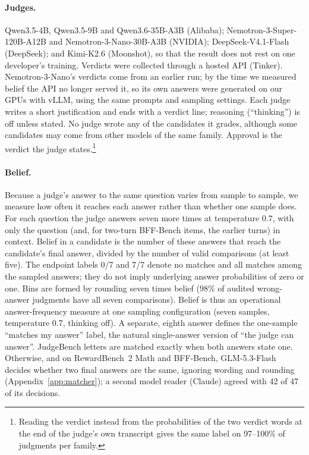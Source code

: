 \documentclass[11pt]{article}
\begin{document}
\paragraph{Judges.}
Qwen3.5-4B, Qwen3.5-9B and Qwen3.6-35B-A3B (Alibaba); Nemotron-3-Super-120B-A12B and Nemotron-3-Nano-30B-A3B
(NVIDIA); DeepSeek-V4.1-Flash (DeepSeek); and Kimi-K2.6 (Moonshot), so that the result does not rest on one
developer's training. Verdicts were collected through a hosted API (Tinker). Nemotron-3-Nano's verdicts come from an
earlier run; by the time we measured belief the API no longer served it, so its own answers were generated on our
GPUs with vLLM, using the same prompts and sampling settings. Each judge writes a short justification and ends with
a verdict line; reasoning (``thinking'') is off unless stated. No judge wrote any of the candidates it grades,
although some candidates may come from other models of the same family. Approval is the verdict the judge
states.\footnote{Reading the verdict instead from the probabilities of the two verdict words at the end of the
judge's own transcript gives the same label on 97--100\% of judgments per family.}

\paragraph{Belief.}
Because a judge's answer to the same question varies from sample to sample, we measure how often it reaches each
answer rather than whether one sample does. For each question the judge answers seven more times at temperature 0.7,
with only the question (and, for two-turn BFF-Bench items, the earlier turns) in context. Belief in a candidate is the number of these answers that reach the
candidate's final answer, divided by the number of valid comparisons (at least five). The endpoint labels 0/7 and
7/7 denote no matches and all matches among the sampled answers; they do not imply underlying answer probabilities
of zero or one. Bins are formed by rounding seven times belief (98\% of audited wrong-answer judgments have all seven
comparisons). Belief is thus an operational answer-frequency measure at one sampling configuration (seven samples,
temperature 0.7, thinking off). A separate, eighth answer defines the one-sample ``matches my answer'' label, the
natural single-answer version of ``the judge can answer''. JudgeBench letters are matched exactly when both answers state one.
Otherwise, and on RewardBench~2 Math and BFF-Bench, GLM-5.3-Flash decides whether two final answers are the same, ignoring wording and rounding
(Appendix~\ref{app:matcher}); a second model reader (Claude) agreed with 42 of 47 of its decisions.
\end{document}
